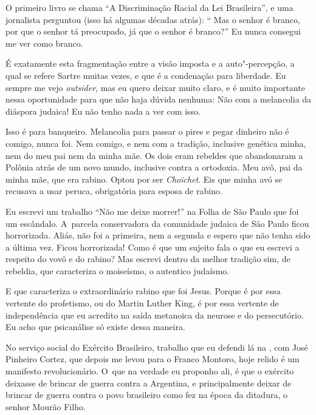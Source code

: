 O primeiro livro se chama ``A Discriminação Racial da Lei Brasileira'',
e uma jornalista perguntou (isso há algumas décadas atrás): `` Mas o
senhor é branco, por que o senhor tá preocupado, já que o senhor é
branco?'' Eu nunca consegui me ver como branco.

 

É exatamente esta fragmentação entre a visão imposta e a auto"-percepção,
a qual se refere Sartre muitas vezes, e que é a condenação para
liberdade. Eu sempre me vejo \emph{outsider}, mas eu quero deixar muito
claro, e é muito importante nessa oportunidade para que não haja dúvida
nenhuma: Não com a melancolia da diáspora judaica! Eu não tenho nada a
ver com isso.

 

Isso é para banqueiro. Melancolia para passar o pires e pegar dinheiro
não é comigo, nunca foi. Nem comigo, e nem com a tradição, inclusive
genética minha, nem do meu pai nem da minha mãe. Os dois eram rebeldes
que abandonaram a Polônia atrás de um novo mundo, inclusive contra a
ortodoxia. Meu avô, pai da minha mãe, que era rabino. Optou por ser
\emph{Choichet}. Eis que minha avó se recusava a usar peruca,
obrigatória para esposa de rabino.

 

Eu escrevi um trabalho ``Não me deixe morrer!'' na Folha de São Paulo
que foi um escândalo. A~parcela conservadora da comunidade judaica de
São Paulo ficou horrorizada. Aliás, não foi a primeira, nem a segunda e
espero que não tenha sido a última vez. Ficou horrorizada! Como é que um
sujeito fala o que eu escrevi a respeito do vovô e do rabino? Mas
escrevi dentro da melhor tradição sim, de rebeldia, que caracteriza o
moiseísmo, o autentico judaísmo.

 

E que caracteriza o extraordinário rabino que foi Jesus. Porque é por
essa vertente do profetismo, ou do Martin Luther King, é por essa
vertente de independência que eu acredito na saída metanoica da neurose
e do persecutório. Eu acho que psicanálise só existe dessa maneira.

 

No serviço social do Exército Brasileiro, trabalho que eu defendi lá na
, com José Pinheiro Cortez, que depois me levou para o Franco
Montoro, hoje relido é um manifesto revolucionário. O~que na verdade eu
proponho ali, é que o exército deixasse de brincar de guerra contra a
Argentina, e principalmente deixar de brincar de guerra contra o povo
brasileiro como fez na época da ditadura, o senhor Mourão Filho.

